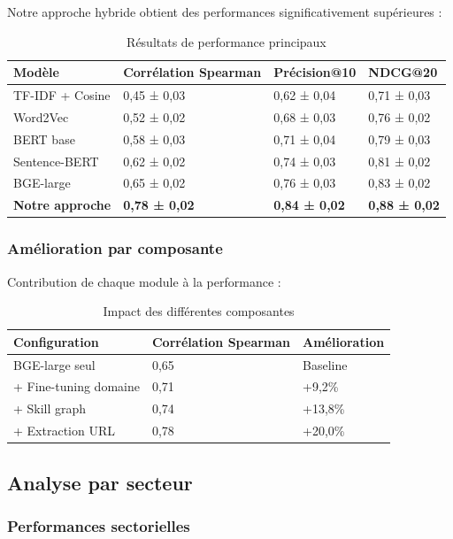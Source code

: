 \documentclass[12pt,a4paper]{report}
\begin{document}
Notre approche hybride obtient des performances significativement supérieures :

\begin{table}[H]
\centering
\caption{Résultats de performance principaux}
\label{tab:resultats-principaux}
\begin{tabular}{@{}llll@{}}
\toprule
Modèle & Corrélation Spearman & Précision@10 & NDCG@20 \\
\midrule
TF-IDF + Cosine & 0,45 ± 0,03 & 0,62 ± 0,04 & 0,71 ± 0,03 \\
Word2Vec & 0,52 ± 0,02 & 0,68 ± 0,03 & 0,76 ± 0,02 \\
BERT base & 0,58 ± 0,03 & 0,71 ± 0,04 & 0,79 ± 0,03 \\
Sentence-BERT & 0,62 ± 0,02 & 0,74 ± 0,03 & 0,81 ± 0,02 \\
BGE-large & 0,65 ± 0,02 & 0,76 ± 0,03 & 0,83 ± 0,02 \\
\textbf{Notre approche} & \textbf{0,78 ± 0,02} & \textbf{0,84 ± 0,02} & \textbf{0,88 ± 0,02} \\
\bottomrule
\end{tabular}
\end{table}

\subsubsection{Amélioration par composante}

Contribution de chaque module à la performance :

\begin{table}[H]
\centering
\caption{Impact des différentes composantes}
\label{tab:impact-composantes}
\begin{tabular}{@{}lll@{}}
\toprule
Configuration & Corrélation Spearman & Amélioration \\
\midrule
BGE-large seul & 0,65 & Baseline \\
+ Fine-tuning domaine & 0,71 & +9,2\% \\
+ Skill graph & 0,74 & +13,8\% \\
+ Extraction URL & 0,78 & +20,0\% \\
\bottomrule
\end{tabular}
\end{table}

\subsection{Analyse par secteur}

\subsubsection{Performances sectorielles}
\end{document}
